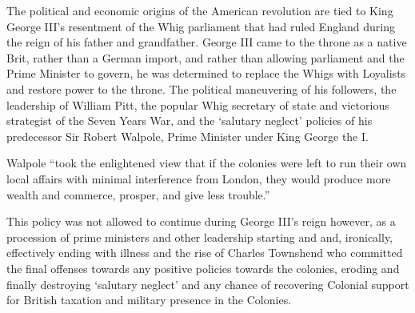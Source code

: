 The political and economic origins of the American revolution are tied to King
George III's resentment of the Whig parliament that had ruled England during the
reign of his father and grandfather. George III came to the throne as a native
Brit, rather than a German import, and rather than allowing parliament and the
Prime Minister to govern, he was determined to replace the Whigs with Loyalists
and restore power to the throne. The political maneuvering of his followers,
the leadership of William Pitt, the popular Whig secretary of state and
victorious strategist of the Seven Years War, and the `salutary
neglect'  policies of his predecessor Sir Robert Walpole, Prime Minister under
King George the I.\cite[Ch 1-4]{cook_long_1995}

Walpole ``took the enlightened view that if the colonies were left to run their
own local affairs with minimal interference from London, they would produce more
wealth and commerce, prosper, and give less trouble.''\cite[p. 3]{cook_long_1995}

This policy was not allowed to continue during George III's reign however, as a
procession of prime ministers and other leadership starting and  and,
ironically, effectively ending with  illness and the rise of Charles
Townshend who committed the final offenses towards any positive policies towards
the colonies, eroding and finally destroying `salutary neglect' and
any chance of recovering Colonial support for British taxation and military
presence in the Colonies.

